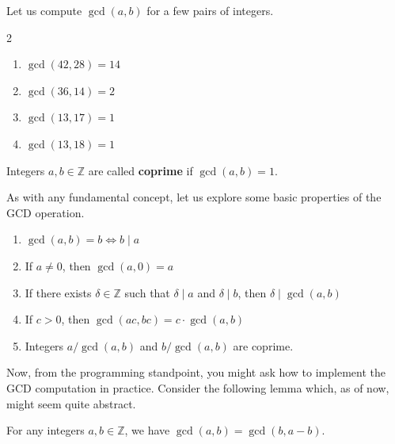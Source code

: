 \documentclass[../../book.tex]{subfiles}
\begin{document}
\begin{example}
    Let us compute $\gcd(a, b)$ for a few pairs of integers.
    
    \begin{xmulticols}{2}
        \begin{enumerate}
            \item $\gcd(42, 28) = 14$
            \item $\gcd(36, 14) = 2$
            \item $\gcd(13, 17) = 1$
            \item $\gcd(13, 18) = 1$
        \end{enumerate}
    \end{xmulticols}
\end{example}

\begin{definition}
    Integers $a, b \in \mathbb{Z}$ are called \textbf{coprime} if $\gcd(a, b) = 1$.
\end{definition}

As with any fundamental concept, let us explore some basic properties of the GCD operation.

\begin{lemma}\label{lemma:gcd_properties}
    \hfill
    \begin{enumerate}
        \item $\gcd(a, b) = b \iff b \mid a$
        \item If $a \neq 0$, then $\gcd(a, 0) = a$
        \item If there exists $\delta \in \mathbb{Z}$ such that $\delta \mid a$ and $\delta \mid b$, then $\delta \mid \gcd(a, b)$
        \item If $c > 0$, then $\gcd(ac, bc) = c \cdot \gcd(a, b)$
        \item Integers $a/\gcd(a,b)$ and $b/\gcd(a,b)$ are coprime.
    \end{enumerate}
\end{lemma}

Now, from the programming standpoint, you might ask how to implement the GCD 
computation in practice. Consider the following lemma which, as of now, might 
seem quite abstract.

\begin{lemma} \label{lemma:gcd_basic_calculation}
    For any integers $a,b \in \mathbb{Z}$, we have $\gcd(a, b) = \gcd(b, a - b)$. 
\end{lemma}
\end{document}
